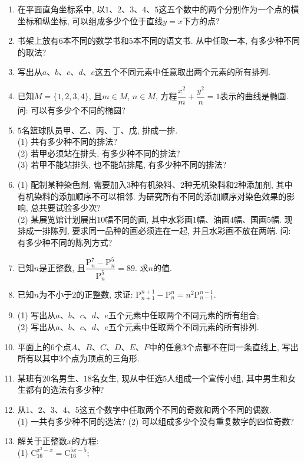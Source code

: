 \documentclass[10pt,a4paper]{article}
\begin{document}
\begin{enumerate}[1.]
\item 在平面直角坐标系中, 以$1$、$2$、$3$、$4$、$5$这五个数中的两个分别作为一个点的横坐标和纵坐标, 可以组成多少个位于直线$y=x$下方的点?
\item 书架上放有$6$本不同的数学书和$5$本不同的语文书. 从中任取一本, 有多少种不同的取法? 
\item 写出从$a$、$b$、$c$、$d$、$e$这五个不同元素中任意取出两个元素的所有排列.
\item 已知$M=\{1,2,3,4\}$, 且$m\in M$, $n\in M$, 方程$\dfrac{x^2}m+\dfrac{y^2}n=1$表示的曲线是椭圆. 问: 可以有多少个不同的椭圆? 
\item $5$名篮球队员甲、乙、丙、丁、戊, 排成一排.\\
(1) 共有多少种不同的排法?\\
(2) 若甲必须站在排头, 有多少种不同的排法?\\
(3) 若甲不能站排头, 也不能站排尾, 有多少种不同的排法?
\item (1) 配制某种染色剂, 需要加入$3$种有机染料、$2$种无机染料和$2$种添加剂, 其中有机染料的添加顺序不可以相邻. 为研究所有不同的添加顺序对染色效果的影响, 总共要试验多少次?\\
(2) 某展览馆计划展出$10$幅不同的画, 其中水彩画$1$幅、油画$4$幅、国画$5$幅. 现排成一排陈列, 要求同一品种的画必须连在一起, 并且水彩画不放在两端. 问: 有多少种不同的陈列方式?
\item 已知$n$是正整数, 且$\dfrac{\mathrm{P}_n^7-\mathrm{P}_n^5}{\mathrm{P}_n^5} =89$. 求$n$的值.
\item 已知$n$为不小于$2$的正整数, 求证: $\mathrm{P}_{n+1}^{n+1}-\mathrm{P}_n^n=n^2\mathrm{P}_{n-1}^{
n-1}$. 
\item (1) 写出从$a$、$b$、$c$、$d$、$e$五个元素中任取两个不同元素的所有组合;\\
(2) 写出从$a$、$b$、$c$、$d$、$e$五个元素中任取两个不同元素的所有排列.
\item 平面上的$6$个点$A$、$B$、$C$、$D$、$E$、$F$中的任意$3$个点都不在同一条直线上, 写出所有以其中$3$个点为顶点的三角形. 
\item 某班有$20$名男生、$18$名女生, 现从中任选$5$人组成一个宣传小组, 其中男生和女生都有的选法有多少种?
\item 从$1$、$2$、$3$、$4$、$5$这五个数字中任取两个不同的奇数和两个不同的偶数.\\
(1) 一共有多少种不同的选法?
(2) 可以组成多少个没有重复数字的四位奇数? 
\item 解关于正整数$x$的方程:\\
(1) $\mathrm{C}_{16}^{x^2-x}=\mathrm{C}_{16}^{5x-5}$;\\

\end{enumerate}
\end{document}
